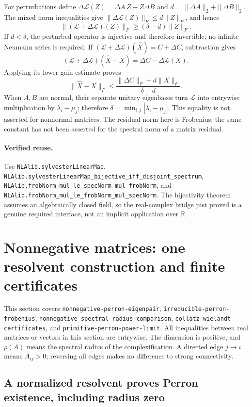 \documentclass[11pt,a4paper]{article}
\newcommand{\R}{\mathbb R}
\DeclareRobustCommand{\code}[1]{{\footnotesize\urlstyle{tt}\nolinkurl{#1}}}
\begin{document}
For perturbations define
$\Delta\mathcal L(Z)=\Delta A\,Z-Z\Delta B$ and
$d=\|\Delta A\|_2+\|\Delta B\|_2$. The mixed norm inequalities give
$\|\Delta\mathcal L(Z)\|_F\le d\|Z\|_F$, and hence
\[
 \|(\mathcal L+\Delta\mathcal L)(Z)\|_F
 \ge(\delta-d)\|Z\|_F.
\]
If $d<\delta$, the perturbed operator is injective and therefore
invertible; no infinite Neumann series is required. If
$(\mathcal L+\Delta\mathcal L)(\widehat X)=C+\Delta C$, subtraction
gives
\[
 (\mathcal L+\Delta\mathcal L)(\widehat X-X)
 =\Delta C-\Delta\mathcal L(X).
\]
Applying its lower-gain estimate proves
\[
 \|\widehat X-X\|_F
 \le\frac{\|\Delta C\|_F+d\|X\|_F}{\delta-d}.
\]
When $A,B$ are normal, their separate unitary eigenbases turn
$\mathcal L$ into entrywise multiplication by $\lambda_i-\mu_j$;
therefore $\delta=\min_{i,j}|\lambda_i-\mu_j|$. This equality is not
asserted for nonnormal matrices. The residual norm here is Frobenius;
the same constant has not been asserted for the spectral norm of a
matrix residual.

\paragraph{Verified reuse.}
Use \code{NLAlib.sylvesterLinearMap},
\code{NLAlib.sylvesterLinearMap_bijective_iff_disjoint_spectrum},
\code{NLAlib.frobNorm_mul_le_specNorm_mul_frobNorm}, and
\code{NLAlib.frobNorm_mul_le_frobNorm_mul_specNorm}.
The bijectivity theorem assumes an algebraically closed field, so the
real-complex bridge just proved is a genuine required interface, not
an implicit application over $\R$.



\section{Nonnegative matrices: one resolvent construction and finite certificates}
\label{sec:ns-perron}

This section covers \code{nonnegative-perron-eigenpair},
\code{irreducible-perron-frobenius},
\code{nonnegative-spectral-radius-comparison},
\code{collatz-wielandt-certificates}, and
\code{primitive-perron-power-limit}. All inequalities between real matrices
or vectors in this section are entrywise. The dimension is positive, and
$\rho(A)$ means the spectral radius of the complexification. A directed
edge $j\to i$ means $A_{ij}>0$; reversing all edges makes no difference to
strong connectivity.

\subsection{A normalized resolvent proves Perron existence, including radius zero}
\end{document}

